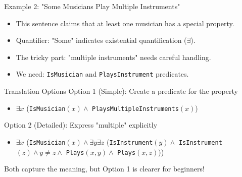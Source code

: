 \documentclass{beamer}
\begin{document}
	\begin{frame}{Example 2: "Some Musicians Play Multiple Instruments"}
		\begin{itemize}
			\item This sentence claims that at least one musician has a special property.
			\item Quantifier: "Some" indicates existential quantification ($\exists$).
			\item The tricky part: "multiple instruments" needs careful handling.
			\item We need: \texttt{IsMusician} and \texttt{PlaysInstrument} predicates.
		\end{itemize}
		
		\begin{alertblock}{Translation Options}
			Option 1 (Simple): Create a predicate for the property
			\begin{itemize}
				\item $\exists x$ (\texttt{IsMusician}$(x) \land$ \texttt{PlaysMultipleInstruments}$(x)$)
			\end{itemize}
			Option 2 (Detailed): Express "multiple" explicitly
			\begin{itemize}
				\item $\exists x$ (\texttt{IsMusician}$(x) \land \exists y \exists z$ (\texttt{IsInstrument}$(y) \land$ \texttt{IsInstrument}$(z) \land y \neq z \land$ \texttt{Plays}$(x,y) \land$ \texttt{Plays}$(x,z)$))
			\end{itemize}
			Both capture the meaning, but Option 1 is clearer for beginners!
		\end{alertblock}
	\end{frame}
	
\end{document}
